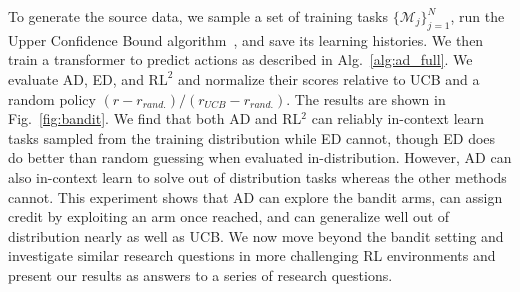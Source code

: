 \documentclass{article}
\theoremstyle{thm}
\newcommand{\name}{AD }
\newcommand{\namenospace}{AD}
\begin{document}
To generate the source data, we sample a set of training tasks $\{ \mathcal M_j\}_{j=1}^N$, run the Upper Confidence Bound algorithm~\citep{lai86ucb}, and save its learning histories. We then train a transformer to predict actions as described in Alg.~\ref{alg:ad_full}. We evaluate \namenospace, ED, and $\text{RL}^2$ and normalize their scores relative to UCB and a random policy ${(r - r_{rand.})}/{ (r_{UCB} - r_{rand.})}$. The results are shown in Fig.~\ref{fig:bandit}. We find that both \name and RL$^2$ can reliably in-context learn tasks sampled from the training distribution while ED cannot, though ED does do better than random guessing when evaluated in-distribution. However, \name can also in-context learn to solve out of distribution tasks whereas the other methods cannot. This experiment shows that \name can explore the bandit arms, can assign credit by exploiting an arm once reached, and can generalize well out of distribution nearly as well as UCB. We now move beyond the bandit setting and investigate similar research questions in more challenging RL environments and present our results as answers to a series of research questions.
\vspace{-2mm}
\end{document}
